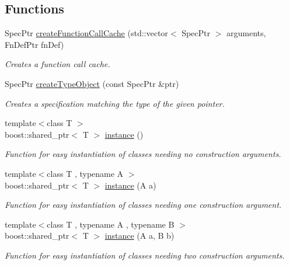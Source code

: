 \subsection*{Functions}
\begin{DoxyCompactItemize}
\item 
Spec\-Ptr \hyperlink{namespacegiskard__suturo_a598c5b3c2838ce29f6d9a269ae0a601d}{create\-Function\-Call\-Cache} (std\-::vector$<$ Spec\-Ptr $>$ arguments, Fn\-Def\-Ptr fn\-Def)
\begin{DoxyCompactList}\small\item\em Creates a function call cache. \end{DoxyCompactList}\item 
Spec\-Ptr \hyperlink{namespacegiskard__suturo_aef7b76df3c95169681fbc40702ab939c}{create\-Type\-Object} (const Spec\-Ptr \&ptr)
\begin{DoxyCompactList}\small\item\em Creates a specification matching the type of the given pointer. \end{DoxyCompactList}\item 
{\footnotesize template$<$class T $>$ }\\boost\-::shared\-\_\-ptr$<$ T $>$ \hyperlink{namespacegiskard__suturo_af5bbc7ef4d715f8370eaaa74109fa6b8}{instance} ()
\begin{DoxyCompactList}\small\item\em Function for easy instantiation of classes needing no construction arguments. \end{DoxyCompactList}\item 
{\footnotesize template$<$class T , typename A $>$ }\\boost\-::shared\-\_\-ptr$<$ T $>$ \hyperlink{namespacegiskard__suturo_af1bb9821602818fc7f379b4220304c5d}{instance} (A a)
\begin{DoxyCompactList}\small\item\em Function for easy instantiation of classes needing one construction argument. \end{DoxyCompactList}\item 
{\footnotesize template$<$class T , typename A , typename B $>$ }\\boost\-::shared\-\_\-ptr$<$ T $>$ \hyperlink{namespacegiskard__suturo_a102b7f8570f3cba8d0e43ae2d575a9a6}{instance} (A a, B b)
\begin{DoxyCompactList}\small\item\em Function for easy instantiation of classes needing two construction arguments. \end{DoxyCompactList}\item 

\end{DoxyCompactItemize}
